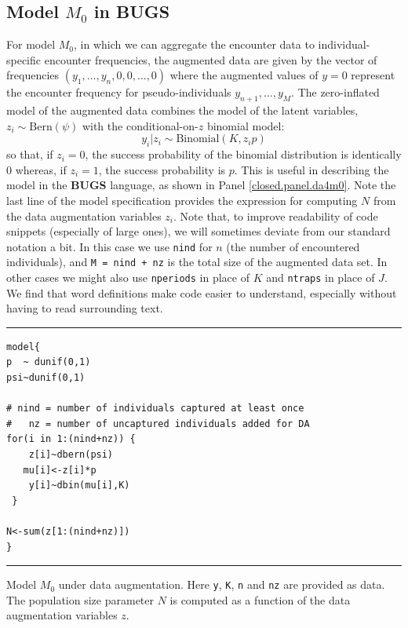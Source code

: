 \subsection{Model $M_0$ in BUGS}

For model $M_0$, in which we can aggregate the encounter data to
individual-specific encounter frequencies, the augmented data are
given by the vector of frequencies $(y_{1}, \ldots, y_{n}, 0, 0,
\ldots, 0)$ where the augmented values of $y=0$ represent the encounter
frequency  for pseudo-individuals $y_{n+1},\ldots,y_{M}$.
The zero-inflated model of the augmented data combines
the model of the latent variables, $z_{i} \sim \mbox{Bern}(\psi)$ with
the conditional-on-$z$ binomial model:
\[
y_{i}|z_{i}   \sim \mbox{Binomial}(K,z_{i} p)
\]
so that, if $z_{i}=0$, the success probability of the binomial
distribution is identically 0 whereas, if $z_{i}=1$, the success
probability is $p$. This is useful in describing the model in the {\bf
  BUGS} language, as shown in Panel \ref{closed.panel.da4m0}.
 Note the last line of the model
specification  provides the expression for computing $N$ from the
data augmentation variables $z_{i}$. Note that, to improve readability of code
snippets (especially of large ones), we will sometimes deviate from our
standard notation a bit. In this case we use \mbox{\tt nind} for $n$
(the number of encountered individuals), and \mbox{\tt M = nind + nz}
is the total size of the augmented data set. In other cases we might
also use \mbox{\tt nperiods} in place of $K$ and \mbox{\tt ntraps} in
place of $J$. We find that word definitions make code easier to
understand, especially without having to read surrounding text.

\begin{panel}[ht]
\centering
\rule[0.15in]{\textwidth}{.03in}
{\small
\begin{verbatim}
model{
p  ~ dunif(0,1)
psi~dunif(0,1)

# nind = number of individuals captured at least once
#   nz = number of uncaptured individuals added for DA
for(i in 1:(nind+nz)) {
    z[i]~dbern(psi)
   mu[i]<-z[i]*p
    y[i]~dbin(mu[i],K)
 }

N<-sum(z[1:(nind+nz)])
}
\end{verbatim}
}
\rule[-0.15in]{\textwidth}{.03in}
\caption{Model $M_{0}$ under data augmentation. Here \mbox{\tt y},
  \mbox{\tt K}, \mbox{\tt n} and \mbox{\tt nz} are provided as
  data. The population size parameter $N$ is computed as a function of
the data augmentation variables $z$. }
\label{closed.panel.da4m0}
\end{panel}

















